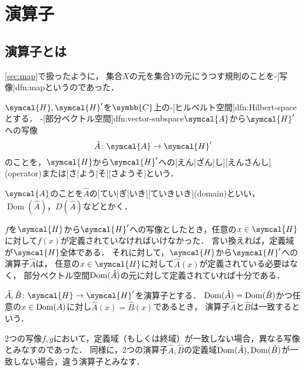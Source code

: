 \documentclass[../sotsu.tex]{subfiles}
\begin{document}
\section{演算子}
\label{sec:operator}

\subsection{演算子とは}
\label{sec:operator-intro}

\cref{sec:map}で扱ったように，
集合$X$の元を集合$Y$の元にうつす規則のことを-[写像]{dfn:map}というのであった．

\begin{definition}[演算子]
    $\symcal{H}, \symcal{H}'$を$\symbb{C}$上の-[ヒルベルト空間]{dfn:Hilbert-space}とする．
    -[部分ベクトル空間]{dfn:vector-subspace}$\symcal{A}$から$\symcal{H}'$への写像
    \begin{equation*}
        \hat{A} \colon \symcal{A} \to \symcal{H}'
    \end{equation*}
    のことを，$\symcal{H}$から$\symcal{H}'$への[えん|ざん|し][えんさんし](operator)または[さ|よう|そ][さようそ]という．
\end{definition}

\begin{definition}[演算子の定義域]
    $\symcal{A}$のことを$\hat{A}$の[てい|ぎ|いき][ていきいき](domain)といい，$\operatorname{Dom}(\hat{A})$，$D(\hat{A})$などとかく．
\end{definition}

$f$を$\symcal{H}$から$\symcal{H}'$への写像としたとき，任意の$x \in \symcal{H}$に対して$f(x)$が定義されていなければいけなかった．
言い換えれば，定義域が$\symcal{H}$全体である．
それに対して，$\symcal{H}$から$\symcal{H}'$への演算子$\hat{A}$は，
任意の$x \in \symcal{H}$に対して$\hat{A}(x)$が定義されている必要はなく，
部分ベクトル空間$\operatorname{Dom}(\hat{A})$の元に対して定義されていれば十分である．


\begin{definition}[演算子の一致]
    $\hat{A}, \hat{B} \colon \symcal{H} \to \symcal{H}'$を演算子とする．
    $\operatorname{Dom}(\hat{A}) = \operatorname{Dom}(\hat{B})$かつ任意の$x \in \operatorname{Dom}(A)$に対し$\hat{A}(x) = \hat{B}(x)$であるとき，
    演算子$\hat{A}$と$\hat{B}$は一致するという．
\end{definition}

2つの写像$f, g$において，定義域（もしくは終域）が一致しない場合，異なる写像とみなすのであった．
同様に，2つの演算子$\hat{A}, \hat{B}$の定義域$\operatorname{Dom}(\hat{A}), \operatorname{Dom}(\hat{B})$が一致しない場合，違う演算子とみなす．
\end{document}
